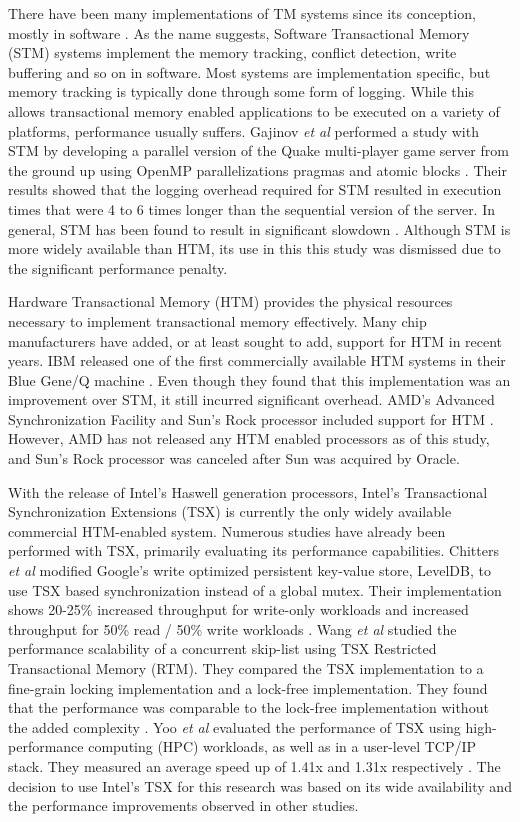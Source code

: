 \documentclass{sig-alternate}
\begin{document}
There have been many implementations of TM systems since its conception, mostly in
software \cite{yoo_tsx,chitters_tsx,rock_dice,chung_amd,blue_wang,quake_stm,stm_cascaval}.
As the name suggests, Software Transactional Memory (STM) systems implement the memory
tracking, conflict detection, write buffering and so on in software.  Most systems are
implementation specific, but memory tracking is typically done through some form of
logging.  While this allows transactional memory enabled applications to be executed on a
variety of platforms, performance usually suffers.  Gajinov \emph{et al} performed a study
with STM by developing a parallel version of the Quake multi-player game server from the
ground up using OpenMP parallelizations pragmas and atomic blocks \cite{quake_stm}.  Their
results showed that the logging overhead required for STM resulted in execution times that
were 4 to 6 times longer than the sequential version of the server.  In general, STM has
been found to result in significant slowdown \cite{stm_cascaval}.  Although STM is more
widely available than HTM, its use in this this study was dismissed due to the significant
performance penalty.

Hardware Transactional Memory (HTM) provides the physical resources necessary to implement
transactional memory effectively.  Many chip manufacturers have added, or at least sought
to add, support for HTM in recent years.  IBM released one of the first commercially
available HTM systems in their Blue Gene/Q machine \cite{blue_wang}.  Even though they
found that this implementation was an improvement over STM, it still incurred significant
overhead.  AMD's Advanced Synchronization Facility and Sun's Rock processor included
support for HTM \cite{chung_amd,rock_dice}.  However, AMD has not released any HTM enabled
processors as of this study, and Sun's Rock processor was canceled after Sun was acquired
by Oracle.

With the release of Intel's Haswell generation processors, Intel's Transactional
Synchronization Extensions (TSX) is currently the only widely available commercial
HTM-enabled system.  Numerous studies have already been performed with TSX, primarily
evaluating its performance capabilities.  Chitters \emph{et al} modified Google's write
optimized persistent key-value store, LevelDB, to use TSX based synchronization instead of
a global mutex.  Their implementation shows 20-25\% increased throughput for write-only
workloads and increased throughput for 50\% read / 50\% write workloads
\cite{chitters_tsx}.  Wang \emph{et al} studied the performance scalability of a
concurrent skip-list using TSX Restricted Transactional Memory (RTM).  They compared the
TSX implementation to a fine-grain locking implementation and a lock-free implementation.
They found that the performance was comparable to the lock-free implementation without the
added complexity \cite{wang_tsx}.  Yoo \emph{et al} evaluated the performance of TSX using
high-performance computing (HPC) workloads, as well as in a user-level TCP/IP stack.  They
measured an average speed up of 1.41x and 1.31x respectively \cite{yoo_tsx}.  The decision
to use Intel's TSX for this research was based on its wide availability and the
performance improvements observed in other studies.
\end{document}
